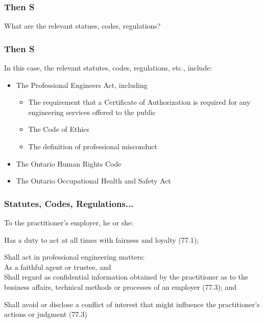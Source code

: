 \begin{frame}
\frametitle{Then S}

What are the relevant statues, codes, regulations?

\end{frame}



\begin{frame}
\frametitle{Then S}

In this case, the relevant statutes, codes, regulations, etc., include:
\begin{itemize}
	\item The Professional Engineers Act, including
	\begin{itemize}
		\item The requirement that a Certificate of Authorization is required for any engineering services offered to the public
		\item The Code of Ethics
		\item The definition of professional misconduct
	\end{itemize}
	\item The Ontario Human Rights Code
	\item The Ontario Occupational Health and Safety Act
\end{itemize}

\end{frame}



\begin{frame}
\frametitle{Statutes, Codes, Regulations...}

To the practitioner's employer, he or she:

Has a duty to act at all times with fairness and loyalty (77.1);

Shall act in professional engineering matters:\\
\quad As a faithful agent or trustee, and\\
\quad Shall regard as confidential information obtained by the practitioner as to the business affairs, technical methods or processes of an employer (77.3); and


Shall avoid or disclose a conflict of interest that might influence the practitioner's actions or judgment (77.3)


\end{frame}



